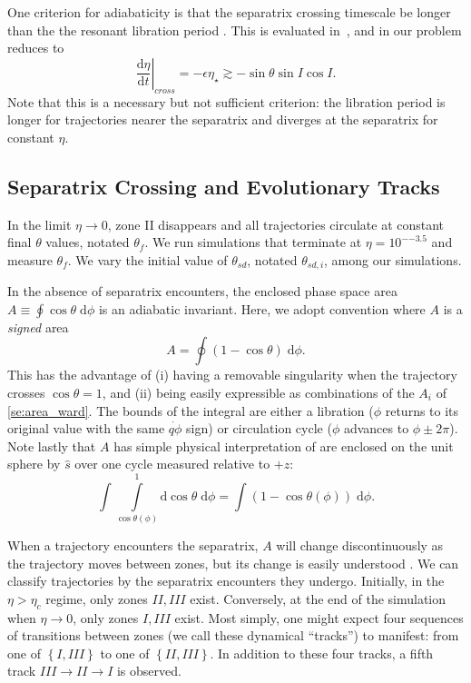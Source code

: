 \documentclass[
        fleqn,
        usenatbib,
    ]{mnras}
\newcommand*{\rd}[2]{\frac{\mathrm{d}#1}{\mathrm{d}#2}}
\newcommand*{\at}[1]{\left.#1\right|}
\newcommand*{\p}[1]{\left(#1\right)}
\newcommand*{\z}[1]{\left\{#1\right\}}
\begin{document}
One criterion for adiabaticity is that the separatrix crossing timescale be
longer than the the resonant libration period \citep{ward2004I}. This is
evaluated in~\cite{millholland_disk}, and in our problem reduces to
\begin{equation}
    \at{\rd{\eta}{t}}_{cross} = -\epsilon\eta_\star \gtrsim
        -\sin\theta \sin I \cos I.\label{eq:ad_constr}
\end{equation}
Note that this is a necessary but not sufficient criterion: the libration period
is longer for trajectories nearer the separatrix and diverges at the separatrix
for constant $\eta$.

\subsection{Separatrix Crossing and Evolutionary Tracks
}\label{ss:zone_transitions}

In the limit $\eta \to 0$, zone II disappears and all trajectories circulate at
constant final $\theta$ values, notated $\theta_f$. We run simulations that
terminate at $\eta = 10^{-{-3.5}}$ and measure $\theta_{f}$. We vary the initial
value of $\theta_{sd}$, notated $\theta_{sd, i}$, among our simulations.

In the absence of separatrix encounters, the enclosed phase space area $A \equiv
\oint \cos\theta \;\mathrm{d}\phi$ is an adiabatic invariant. Here, we adopt
convention where $A$ is a \emph{signed} area
\begin{equation}
    A = \oint \p{1 - \cos \theta}\;\mathrm{d}\phi.
\end{equation}
This has the advantage of (i) having a removable singularity when the trajectory
crosses $\cos \theta = 1$, and (ii) being easily expressible as combinations of
the $A_i$ of \autoref{se:area_ward}. The bounds of the integral are either a
libration ($\phi$ returns to its original value with the same $\dot{q\phi}$
sign) or circulation cycle ($\phi$ advances to $\phi \pm 2\pi$). Note lastly
that $A$ has simple physical interpretation of are enclosed on the unit sphere
by $\hat{s}$ over one cycle measured relative to $+\hat{z}$:
\begin{equation*}
    \int \int\limits_{\cos \theta(\phi)}^1
        \mathrm{d}\cos\theta\;\mathrm{d}\phi = \int \p{1 - \cos \theta(\phi)}
            \;\mathrm{d}\phi.
\end{equation*}

When a trajectory encounters the separatrix, $A$ will change discontinuously as
the trajectory moves between zones, but its change is easily understood
\citep{henrard1982}. We can classify trajectories by the separatrix encounters
they undergo. Initially, in the $\eta > \eta_c$ regime, only zones $II, III$
exist. Conversely, at the end of the simulation when $\eta \to 0$, only zones
$I, III$ exist. Most simply, one might expect four sequences of transitions
between zones (we call these dynamical ``tracks'') to manifest: from one of
$\z{I, III}$ to one of $\z{II, III}$. In addition to these four tracks, a
fifth track $III \to II \to I$ is observed.
\end{document}
